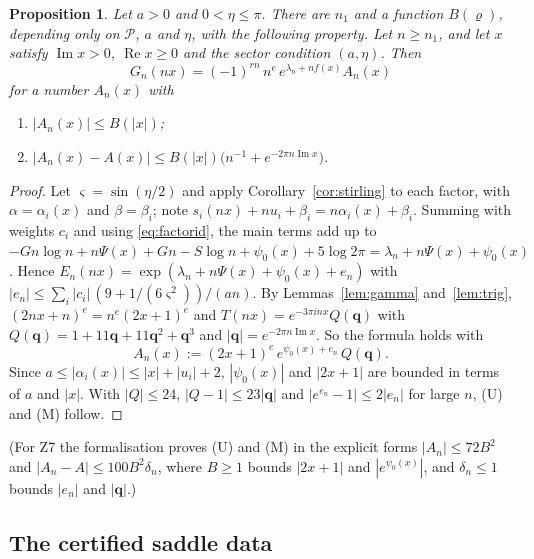 \documentclass[11pt]{amsart}
\newtheorem{proposition}[theorem]{Proposition}
\theoremstyle{definition}
\theoremstyle{remark}
\numberwithin{equation}{section}
\newcommand{\cP}{\mathcal{P}}
\renewcommand{\Re}{\operatorname{Re}}
\renewcommand{\Im}{\operatorname{Im}}
\begin{document}
\begin{proposition}\label{prop:integrand}
Let $a>0$ and $0<\eta\le\pi$. There are $n_1$ and a function $B(\varrho)$, depending only on $\cP$, $a$ and $\eta$,
with the following property. Let $n\ge n_1$, and let $x$ satisfy $\Im x>0$, $\Re x\ge0$ and the sector condition
$(a,\eta)$. Then
\[
  G_n(nx)=(-1)^{rn}\,n^e\,e^{\lambda_n+nf(x)}A_n(x)
\]
for a number $A_n(x)$ with
\begin{enumerate}
\item[(U)] $|A_n(x)|\le B(|x|)$;
\item[(M)] $|A_n(x)-A(x)|\le B(|x|)\bigl(n^{-1}+e^{-2\pi n\Im x}\bigr)$.
\end{enumerate}
\end{proposition}

\begin{proof}
Let $\varsigma=\sin(\eta/2)$ and apply Corollary~\ref{cor:stirling} to each factor, with $\alpha=\alpha_i(x)$ and
$\beta=\beta_i$; note $s_i(nx)+nu_i+\beta_i=n\alpha_i(x)+\beta_i$. Summing with weights $c_i$ and using
\eqref{eq:factorid}, the main terms add up to
$-Gn\log n+n\Psi(x)+Gn-S\log n+\psi_0(x)+5\log2\pi=\lambda_n+n\Psi(x)+\psi_0(x)$. Hence
$E_n(nx)=\exp(\lambda_n+n\Psi(x)+\psi_0(x)+e_n)$ with $|e_n|\le\sum_i|c_i|\,(9+1/(6\varsigma^2))/(an)$. By
Lemmas~\ref{lem:gamma} and~\ref{lem:trig}, $(2nx+n)^e=n^e(2x+1)^e$ and
$T(nx)=e^{-3\pi inx}Q(\mathbf q)$ with $Q(\mathbf q)=1+11\mathbf q+11\mathbf q^2+\mathbf q^3$ and
$|\mathbf q|=e^{-2\pi n\Im x}$. So the formula holds with
\[
  A_n(x):=(2x+1)^e\,e^{\psi_0(x)+e_n}\,Q(\mathbf q).
\]
Since $a\le|\alpha_i(x)|\le|x|+|u_i|+2$, $|\psi_0(x)|$ and $|2x+1|$ are bounded in terms of $a$ and $|x|$. With
$|Q|\le24$, $|Q-1|\le23|\mathbf q|$ and $|e^{e_n}-1|\le2|e_n|$ for large $n$, (U) and (M) follow.
\end{proof}

(For Z7 the formalisation proves (U) and (M) in the explicit forms $|A_n|\le72B^2$ and
$|A_n-A|\le100B^2\delta_n$, where $B\ge1$ bounds $|2x+1|$ and $|e^{\psi_0(x)}|$, and $\delta_n\le1$ bounds $|e_n|$
and $|\mathbf q|$.)

\subsection{The certified saddle data}
\end{document}
